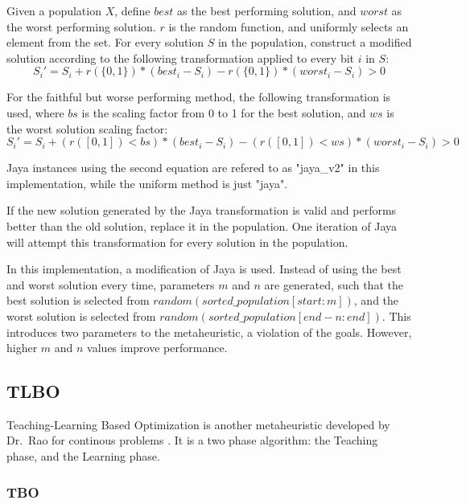 \documentclass[11pt, letterpaper, onecolumn]{article}
\begin{document}
 Given a population $X$, define $best$ as the best performing solution, and $worst$ as the worst performing solution. $r$ is the random function, and uniformly selects an element from the set. For every solution $S$ in the population, construct a modified solution according to the following transformation applied to every bit $i$ in $S$:
\begin{equation} S_i' = S_i + r(\{0, 1\})*(best_i - S_i) - r(\{0, 1\})*(worst_i - S_i) > 0 \end{equation}

For the faithful but worse performing method, the following transformation is used, where $bs$ is the scaling factor from 0 to 1 for the best solution, and $ws$ is the worst solution scaling factor: 
\begin{equation} S_i' = S_i + (r([0,1])<bs)*(best_i - S_i) - (r([0, 1])<ws)*(worst_i - S_i) > 0 \end{equation}

Jaya instances using the second equation are refered to as "jaya\_v2" in this implementation, while the uniform method is just "jaya". 

If the new solution generated by the Jaya transformation is valid and performs better than the old solution, replace it in the population. One iteration of Jaya will attempt this transformation for every solution in the population. 

In this implementation, a modification of Jaya is used. Instead of using the best and worst solution every time, parameters $m$ and $n$ are generated, such that the best solution is selected from $random(sorted\_population[start:m])$, and the worst solution is selected from $random(sorted\_population[end-n:end])$. This introduces two parameters to the metaheuristic, a violation of the goals. However, higher $m$ and $n$ values improve performance. 

\subsection{TLBO}

Teaching-Learning Based Optimization is another metaheuristic developed by Dr.~Rao for continous problems %
. It is a two phase algorithm: the Teaching phase, and the Learning phase.

\subsubsection{TBO}
\end{document}
